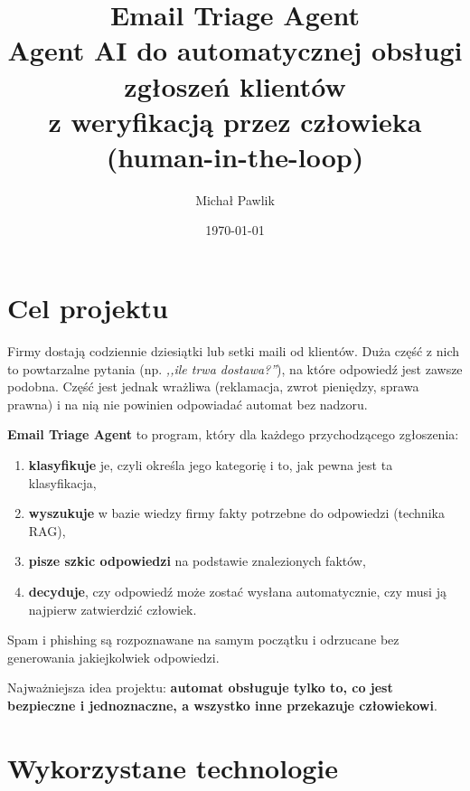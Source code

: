 \documentclass[11pt,a4paper]{article}
\title{\textbf{Email Triage Agent}\\[0.3em]
\large Agent AI do automatycznej obsługi zgłoszeń klientów\\
z weryfikacją przez człowieka (human-in-the-loop)}
\author{Michał Pawlik}
\date{\today}
\begin{document}
\maketitle

\tableofcontents
\newpage

\section{Cel projektu}

Firmy dostają codziennie dziesiątki lub setki maili od klientów. Duża część
z nich to powtarzalne pytania (np. \emph{,,ile trwa dostawa?''}), na które
odpowiedź jest zawsze podobna. Część jest jednak wrażliwa (reklamacja, zwrot
pieniędzy, sprawa prawna) i na nią nie powinien odpowiadać automat bez
nadzoru.

\textbf{Email Triage Agent} to program, który dla każdego przychodzącego
zgłoszenia:

\begin{enumerate}
  \item \textbf{klasyfikuje} je, czyli określa jego kategorię i to, jak
        pewna jest ta klasyfikacja,
  \item \textbf{wyszukuje} w bazie wiedzy firmy fakty potrzebne do odpowiedzi
        (technika RAG),
  \item \textbf{pisze szkic odpowiedzi} na podstawie znalezionych faktów,
  \item \textbf{decyduje}, czy odpowiedź może zostać wysłana automatycznie,
        czy musi ją najpierw zatwierdzić człowiek.
\end{enumerate}

Spam i phishing są rozpoznawane na samym początku i odrzucane bez
generowania jakiejkolwiek odpowiedzi.

Najważniejsza idea projektu: \textbf{automat obsługuje tylko to, co jest
bezpieczne i jednoznaczne, a wszystko inne przekazuje człowiekowi}.

\section{Wykorzystane technologie}
\end{document}
